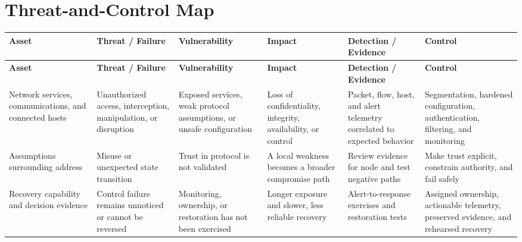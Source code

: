 \documentclass[11pt,letterpaper]{article}
\begin{document}
\section*{Threat-and-Control Map}
\begingroup\scriptsize\setlength{\tabcolsep}{2pt}
\begin{longtable}{>{\raggedright\arraybackslash}p{}>{\raggedright\arraybackslash}p{}>{\raggedright\arraybackslash}p{}>{\raggedright\arraybackslash}p{}>{\raggedright\arraybackslash}p{}>{\raggedright\arraybackslash}p{}}
\toprule\rowcolor{Navy}\color{white}\textbf{Asset} & \color{white}\textbf{Threat / Failure} & \color{white}\textbf{Vulnerability} & \color{white}\textbf{Impact} & \color{white}\textbf{Detection / Evidence} & \color{white}\textbf{Control}\\\midrule
\endfirsthead
\toprule\rowcolor{Navy}\color{white}\textbf{Asset} & \color{white}\textbf{Threat / Failure} & \color{white}\textbf{Vulnerability} & \color{white}\textbf{Impact} & \color{white}\textbf{Detection / Evidence} & \color{white}\textbf{Control}\\\midrule
\endhead
Network services, communications, and connected hosts & Unauthorized access, interception, manipulation, or disruption & Exposed services, weak protocol assumptions, or unsafe configuration & Loss of confidentiality, integrity, availability, or control & Packet, flow, host, and alert telemetry correlated to expected behavior & Segmentation, hardened configuration, authentication, filtering, and monitoring\\\midrule
Assumptions surrounding address & Misuse or unexpected state transition & Trust in protocol is not validated & A local weakness becomes a broader compromise path & Review evidence for node and test negative paths & Make trust explicit, constrain authority, and fail safely\\\midrule
Recovery capability and decision evidence & Control failure remains unnoticed or cannot be reversed & Monitoring, ownership, or restoration has not been exercised & Longer exposure and slower, less reliable recovery & Alert-to-response exercises and restoration tests & Assigned ownership, actionable telemetry, preserved evidence, and rehearsed recovery\\\midrule
\bottomrule
\end{longtable}
\endgroup
\end{document}

